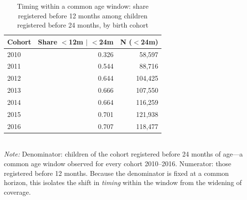 \begin{table}[htbp]\centering
\caption{Timing within a common age window: share registered before 12 months among children registered before 24 months, by birth cohort}
\label{tab:P5timing}
\footnotesize
\setlength{\tabcolsep}{4pt}
\begin{tabular}{lrr}
\toprule
Cohort & Share $<$12m $\mid$ $<$24m & N ($<$24m) \\
\midrule
2010 & 0.326 & 58,597 \\
2011 & 0.544 & 88,716 \\
2012 & 0.644 & 104,425 \\
2013 & 0.666 & 107,550 \\
2014 & 0.664 & 116,259 \\
2015 & 0.701 & 121,938 \\
2016 & 0.707 & 118,477 \\
\bottomrule
\end{tabular}
\\[3pt]{\footnotesize \textit{Note:} Denominator: children of the cohort registered before 24 months of age---a common age window observed for every cohort 2010--2016. Numerator: those registered before 12 months. Because the denominator is fixed at a common horizon, this isolates the shift in \emph{timing} within the window from the widening of coverage.}
\end{table}
